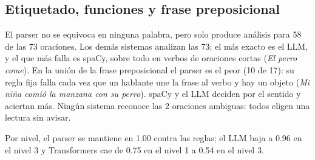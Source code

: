 \subsection{Etiquetado, funciones y frase preposicional}

\begin{table}[h]
  \centering
  \small
  \caption{Errores de etiquetado y exactitud del análisis. El parser solo analiza las 58
    oraciones que puede derivar (304 palabras).}
  \label{tab:analisis}
\end{table}

El parser no se equivoca en ninguna palabra, pero solo produce análisis para 58 de las 73
oraciones. Los demás sistemas analizan las 73; el más exacto es el LLM, y el que más falla es
spaCy, sobre todo en verbos de oraciones cortas (\emph{El perro come}). En la unión de la frase
preposicional el parser es el peor (10 de 17): su regla fija falla cada vez que un hablante une
la frase al verbo y hay un objeto (\emph{Mi niña comió la manzana con su perro}). spaCy y el LLM
deciden por el sentido y aciertan más. Ningún sistema reconoce las 2 oraciones ambiguas: todos
eligen una lectura sin avisar.

Por nivel, el parser se mantiene en 1.00 contra las reglas; el LLM baja a 0.96 en el nivel 3
y Transformers cae de 0.75 en el nivel 1 a 0.54 en el nivel 3.
